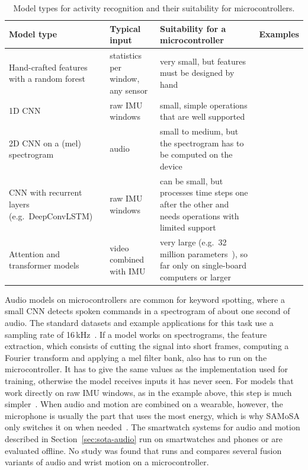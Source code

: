 \begin{table}[!ht]
\centering
\small
\renewcommand{\arraystretch}{1.2}
\begin{tabularx}{\textwidth}{|>{\raggedright\arraybackslash}p{3.0cm}|>{\raggedright\arraybackslash}p{2.4cm}|>{\raggedright\arraybackslash}X|>{\raggedright\arraybackslash}p{2.0cm}|}
\hline
\textbf{Model type} & \textbf{Typical input} & \textbf{Suitability for a microcontroller}
  & \textbf{Examples} \\
\hline
Hand-crafted features with a random forest
  & statistics per window, any sensor
  & very small, but features must be designed by hand
  & \cite{chatterjee2020laso, koch2024recognition} \\
\hline
1D CNN
  & raw IMU windows
  & small, simple operations that are well supported
  & \cite{tao2018worker, alamin2019action, zhou2025efficient} \\
\hline
2D CNN on a (mel) spectrogram
  & audio
  & small to medium, but the spectrogram has to be computed on the device
  & \cite{koch2024recognition} \\
\hline
CNN with recurrent layers (e.g.\ DeepConvLSTM)
  & raw IMU windows
  & can be small, but processes time steps one after the other and needs
    operations with limited support
  & \cite{zhou2025efficient} \\
\hline
Attention and transformer models
  & video combined with IMU
  & very large (e.g.\ 32 million parameters~\cite{gao2023mmtsa}), so far only
    on single-board computers or larger
  & \cite{gao2023mmtsa, bonyani2026multimodal} \\
\hline
\end{tabularx}
\caption{Model types for activity recognition and their suitability for
microcontrollers.}
\label{tab:sota-models}
\end{table}

Audio models on microcontrollers are common for keyword spotting, where a
small CNN detects spoken commands in a spectrogram of about one second of audio.
The standard datasets and example applications for this task use a sampling
rate of 16\,kHz~\cite{warden2018speech, zhang2017hello}. If a model works on spectrograms, the feature extraction,
which consists of cutting the signal into short frames, computing a Fourier
transform and applying a mel filter bank, also has to run on the
microcontroller. It has to give the same values as the implementation used for
training, otherwise the model receives inputs it has never seen. For models that
work directly on raw IMU windows, as in the example above, this step is much
simpler~\cite{zhou2025efficient}. When audio and motion are
combined on a wearable, however, the microphone is usually the part that uses
the most energy, which is why SAMoSA only switches it on when
needed~\cite{mollyn2022samosa}. The smartwatch systems for audio and motion
described in Section~\ref{sec:sota-audio} run on smartwatches and phones or are
evaluated offline. No study was found that runs and compares several fusion
variants of audio and wrist motion on a microcontroller.


